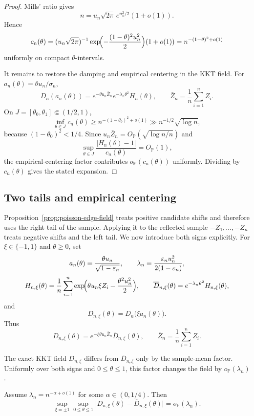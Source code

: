 \begin{proof}
Mills' ratio gives
\[
    n
    =
    u_n\sqrt{2\pi}\,e^{u_n^2/2}(1+o(1)).
\]
Hence
\[
    c_n(\theta)
    =
    (u_n\sqrt{2\pi})^{-1}
    \exp\!\Bigl(-\frac{(1-\theta)^2u_n^2}{2}\Bigr)(1+o(1))
    =
    n^{-(1-\theta)^2+o(1)}
\]
uniformly on compact $\theta$-intervals.

It remains to restore the damping and empirical centering in the KKT field.
For $a_n(\theta)=\theta u_n/\sigma_n$,
\[
    D_n(a_n(\theta))
    =
    e^{-\theta u_n\bar Z_n}
    e^{-\lambda_n\theta^2}
    H_n(\theta),
    \qquad
    \bar Z_n=\frac1n\sum_{i=1}^n Z_i.
\]
On $J=[\theta_0,\theta_1]\Subset(1/2,1)$,
\[
    \inf_{\theta\in J}c_n(\theta)
    \ge
    n^{-(1-\theta_0)^2+o(1)}
    \gg n^{-1/2}\sqrt{\log n},
\]
because $(1-\theta_0)^2<1/4$. Since $u_n\bar Z_n=O_{\mathbb P}(\sqrt{\log n/n})$ and
\[
    \sup_{\theta\in J}
    \frac{|H_n(\theta)-1|}{c_n(\theta)}
    =
    O_{\mathbb P}(1),
\]
the empirical-centering factor contributes $o_{\mathbb P}(c_n(\theta))$ uniformly. Dividing by $c_n(\theta)$ gives the stated expansion.
\end{proof}

\subsection{Two tails and empirical centering}

Proposition~\ref{prop:poisson-edge-field} treats positive candidate shifts and
therefore uses the right tail of the sample. Applying it to the reflected
sample $-Z_1,\ldots,-Z_n$ treats negative shifts and the left tail. We now
introduce both signs explicitly.
For $\xi\in\{-1,1\}$ and $\theta\ge0$, set
\[
    a_n(\theta)=\frac{\theta u_n}{\sqrt{1-\varepsilon_n}},
    \qquad
    \lambda_n=\frac{\varepsilon_nu_n^2}{2(1-\varepsilon_n)},
\]
\[
    H_{n,\xi}(\theta)
    =
    \frac1n\sum_{i=1}^n
    \exp\!\Bigl(\theta u_n\xi Z_i-\frac{\theta^2u_n^2}{2}\Bigr),
    \qquad
    \overline D_{n,\xi}(\theta)
    =
    e^{-\lambda_n\theta^2}H_{n,\xi}(\theta),
\]
and
\[
    D_{n,\xi}(\theta)
    =
    D_n\bigl(\xi a_n(\theta)\bigr).
\]
Thus
\[
    D_{n,\xi}(\theta)
    =
    e^{-\xi\theta u_n\bar Z_n}\overline D_{n,\xi}(\theta),
    \qquad
    \bar Z_n=\frac1n\sum_{i=1}^n Z_i.
\]

The exact KKT field $D_{n,\xi}$ differs from $\overline D_{n,\xi}$ only by
the sample-mean factor. Uniformly over both signs and \(0\le\theta\le1\),
this factor changes the field by \(o_{\mathbb P}(\lambda_n)\).

\begin{lemma}
\label{lem:uniform-centering}
Assume $\lambda_n=n^{-\alpha+o(1)}$ for some $\alpha\in(0,1/4)$. Then
\[
    \sup_{\xi=\pm1}\sup_{0\le\theta\le1}
    \bigl|D_{n,\xi}(\theta)-\overline D_{n,\xi}(\theta)\bigr|
    =
    o_{\mathbb P}(\lambda_n).
\]
\end{lemma}

